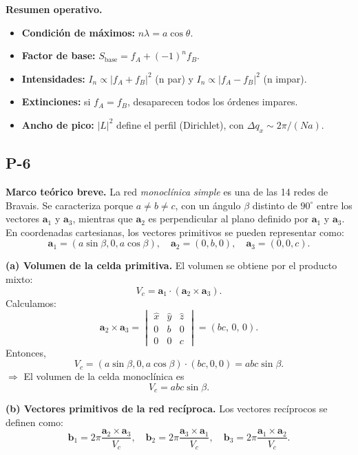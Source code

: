 \documentclass{article}
\begin{document}
\bigskip
\textbf{Resumen operativo.}
\begin{itemize}
\item \textbf{Condición de máximos:} \(n\lambda=a\cos\theta\).
\item \textbf{Factor de base:} \(S_{\text{base}}=f_A+(-1)^n f_B\).
\item \textbf{Intensidades:} \(I_n\propto|f_A+f_B|^2\) (n par) y \(I_n\propto|f_A-f_B|^2\) (n impar).
\item \textbf{Extinciones:} si \(f_A=f_B\), desaparecen todos los órdenes impares.
\item \textbf{Ancho de pico:} \(|L|^2\) define el perfil (Dirichlet), con \(\Delta q_x\sim 2\pi/(Na)\).
\end{itemize}


\subsection{P-6}

\textbf{Marco teórico breve.}  
La red \emph{monoclínica simple} es una de las 14 redes de Bravais. Se caracteriza porque \(a\neq b\neq c\), con un ángulo \(\beta\) distinto de \(90^\circ\) entre los vectores \(\mathbf{a}_1\) y \(\mathbf{a}_3\), mientras que \(\mathbf{a}_2\) es perpendicular al plano definido por \(\mathbf{a}_1\) y \(\mathbf{a}_3\).  
En coordenadas cartesianas, los vectores primitivos se pueden representar como:
\[
\mathbf{a}_1=(a\sin\beta,0,a\cos\beta),\quad 
\mathbf{a}_2=(0,b,0),\quad 
\mathbf{a}_3=(0,0,c).
\]

\medskip
\textbf{(a) Volumen de la celda primitiva.}  
El volumen se obtiene por el producto mixto:
\[
V_c=\mathbf{a}_1\cdot(\mathbf{a}_2\times\mathbf{a}_3).
\]
Calculamos:
\[
\mathbf{a}_2\times\mathbf{a}_3=
\begin{vmatrix}
\hat{x} & \hat{y} & \hat{z}\\
0 & b & 0\\
0 & 0 & c
\end{vmatrix}
=(bc,\,0,\,0).
\]
Entonces,
\[
V_c=(a\sin\beta,0,a\cos\beta)\cdot(bc,0,0)=abc\sin\beta.
\]
\(\Rightarrow\) El volumen de la celda monoclínica es
\[
\boxed{V_c=abc\sin\beta.}
\]

\medskip
\textbf{(b) Vectores primitivos de la red recíproca.}  
Los vectores recíprocos se definen como:
\[
\mathbf{b}_1=2\pi\frac{\mathbf{a}_2\times\mathbf{a}_3}{V_c},\quad 
\mathbf{b}_2=2\pi\frac{\mathbf{a}_3\times\mathbf{a}_1}{V_c},\quad 
\mathbf{b}_3=2\pi\frac{\mathbf{a}_1\times\mathbf{a}_2}{V_c}.
\]
\end{document}
